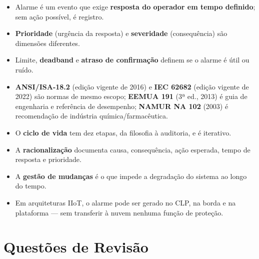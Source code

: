 \begin{itemize}
\tightlist
\item
  Alarme é um evento que exige \textbf{resposta do operador em tempo definido}; sem ação possível, é registro.
\item
  \textbf{Prioridade} (urgência da resposta) e \textbf{severidade} (consequência) são dimensões diferentes.
\item
  Limite, \textbf{deadband} e \textbf{atraso de confirmação} definem se o alarme é útil ou ruído.
\item
  \textbf{ANSI/ISA-18.2} (edição vigente de 2016) e \textbf{IEC 62682} (edição vigente de 2022) são normas de mesmo escopo; \textbf{EEMUA 191} (3ª ed., 2013) é guia de engenharia e referência de desempenho; \textbf{NAMUR NA 102} (2003) é recomendação de indústria química/farmacêutica.
\item
  O \textbf{ciclo de vida} tem dez etapas, da filosofia à auditoria, e é iterativo.
\item
  A \textbf{racionalização} documenta causa, consequência, ação esperada, tempo de resposta e prioridade.
\item
  A \textbf{gestão de mudanças} é o que impede a degradação do sistema ao longo do tempo.
\item
  Em arquiteturas IIoT, o alarme pode ser gerado no CLP, na borda e na plataforma --- sem transferir à nuvem nenhuma função de proteção.
\end{itemize}

\section{Questões de Revisão}\label{questuxf5es-de-revisuxe3o}

